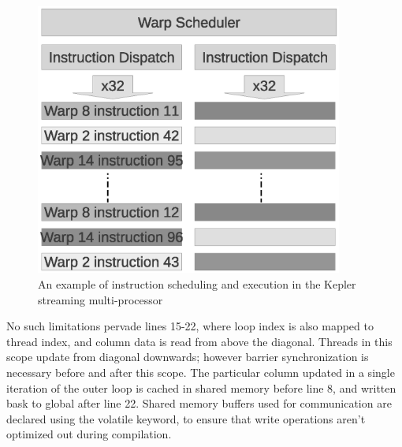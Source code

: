 \documentclass[letter, 12pt]{article}
\begin{document}
\begin{figure}[h!]   
\begin{centering}
\includegraphics[width=0.9\textwidth]{kepler.eps} \caption{An example of instruction scheduling and execution in the Kepler streaming multi-processor} 
\end{centering}
\end{figure} 




No such limitations pervade lines 15-22, where loop index is also mapped to thread index, and column data is read from above the diagonal. Threads in this scope update from  diagonal downwards; however barrier synchronization is necessary before and after this scope. The particular column updated in a single iteration of the outer loop is cached in shared memory before line 8, and written bask to global after line 22. Shared memory buffers used for communication are declared using the volatile keyword, to ensure that write operations aren't optimized out during compilation. 
\end{document}
